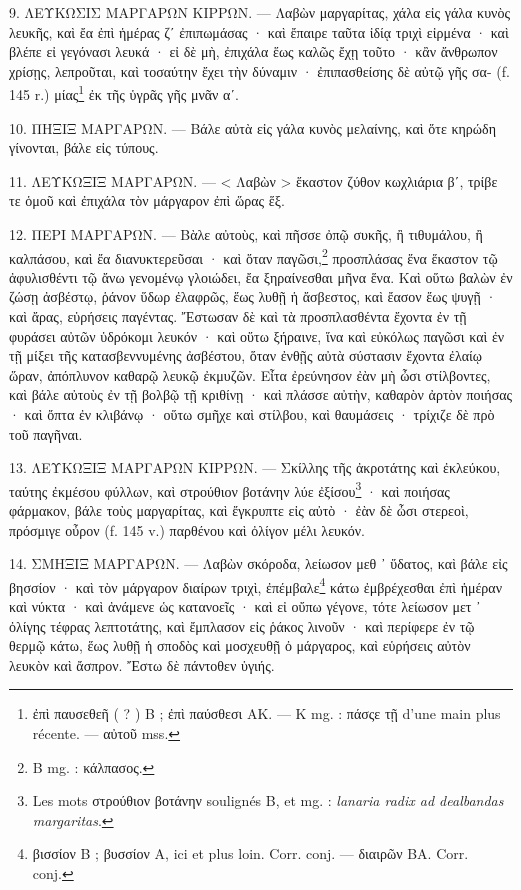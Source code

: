 \documentclass[a4paper, 11pt, oneside, polutonikogreek, french]{article}
\begin{document}
9. ΛΕΥΚΩΣΙΣ ΜΑΡΓΑΡΩΝ ΚΙΡΡΩΝ. --- Λαβὼν μαργαρίτας, χάλα εἰς γάλα κυνὸς λευκῆς, καὶ ἔα ἐπὶ ἡμέρας ζʹ ἐπιπωμάσας · καὶ ἔπαιρε ταῦτα ἰδίᾳ τριχὶ εἰρμένα · καὶ βλέπε εἰ γεγόνασι λευκά · εἰ δὲ μὴ, ἐπιχάλα ἕως καλῶς ἔχῃ τοῦτο · κἂν ἄνθρωπον χρίσῃς, λεπροῦται, καὶ τοσαύτην ἔχει τὴν δύναμιν · ἐπιπασθείσης δὲ αὐτῷ γῆς σα- (f. 145 r.) μίας\footnote{ἐπὶ παυσεθεῆ ( ? ) B ; ἐπὶ παύσθεσι AK. --- K mg. : πάσςε τῇ d'une main plus récente. --- αὐτοῦ mss.} ἐκ τῆς ὑγρᾶς γῆς μνᾶν αʹ.

10. ΠΗΞΙΞ ΜΑΡΓΑΡΩΝ. --- Βάλε αὐτὰ εἰς γάλα κυνὸς μελαίνης, καὶ ὅτε κηρώδη γίνονται, βάλε εἰς τύπους.

11. ΛΕΥΚΩΞΙΞ ΜΑΡΓΑΡΩΝ. --- < Λαβὼν > ἕκαστον ζύθον κωχλιάρια βʹ, τρίβε τε ὁμοῦ καὶ ἐπιχάλα τὸν μάργαρον ἐπὶ ὥρας ἕξ.

12. ΠΕΡΙ ΜΑΡΓΑΡΩΝ. --- Βὰλε αὐτοὺς, καὶ πῆσσε ὀπῷ συκῆς, ἢ τιθυμάλου, ἢ καλπάσου, καὶ ἔα διανυκτερεῦσαι · καὶ ὅταν παγῶσι,\footnote{B mg. : κάλπασος.} προσπλάσας ἕνα ἕκαστον τῷ ἀφυλισθέντι τῷ ἄνω γενομένῳ γλοιώδει, ἔα ξηραίνεσθαι μῆνα ἕνα. Καὶ οὕτω βαλὼν ἐν ζώσῃ ἀσβέστῳ, ῥάνον ὕδωρ ἐλαφρῶς, ἕως λυθῇ ἡ ἄσβεστος, καὶ ἔασον ἕως ψυγῇ · καὶ ἄρας, εὑρήσεις παγέντας. Ἔστωσαν δὲ καὶ τὰ προσπλασθέντα ἔχοντα ἐν τῇ φυράσει αὐτῶν ὑδρόκομι λευκόν · καὶ οὕτω ξήραινε, ἵνα καὶ εὐκόλως παγῶσι καὶ ἐν τῇ μίξει τῆς κατασβεννυμένης ἀσβέστου, ὅταν ἐνθῇς αὐτὰ σύστασιν ἔχοντα ἐλαίῳ ὥραν, ἀπόπλυνον καθαρῷ λευκῷ ἐκμυζῶν. Εἶτα ἐρεύνησον ἐὰν μὴ ὦσι στίλβοντες, καὶ βάλε αὐτοὺς ἐν τῇ βολβῷ τῇ κριθίνῃ · καὶ πλάσσε αὐτὴν, καθαρὸν ἀρτὸν ποιήσας · καὶ ὄπτα ἐν κλιβάνῳ · οὕτω σμῆχε καὶ στίλβου, καὶ θαυμάσεις · τρίχιζε δὲ πρὸ τοῦ παγῆναι.

13. ΛΕΥΚΩΞΙΞ ΜΑΡΓΑΡΩΝ ΚΙΡΡΩΝ. --- Σκίλλης τῆς ἀκροτάτης καὶ ἐκλεύκου, ταύτης ἐκμέσου φύλλων, καὶ στρούθιον βοτάνην λύε ἐξίσου\footnote{Les mots στρούθιον βοτάνην soulignés B, et mg. : \emph{lanaria radix ad dealbandas margaritas}.} · καὶ ποιήσας φάρμακον, βάλε τοὺς μαργαρίτας, καὶ ἔγκρυπτε εἰς αὐτὸ · ἐὰν δὲ ὦσι στερεοὶ, πρόσμιγε οὖρον (f. 145 v.) παρθένου καὶ ὀλίγον μέλι λευκόν.

14. ΣΜΗΞΙΞ ΜΑΡΓΑΡΩΝ. --- Λαβὼν σκόροδα, λείωσον μεθ ᾽ ὕδατος, καὶ βάλε εἰς βησσίον · καὶ τὸν μάργαρον διαίρων τριχὶ, ἐπέμβαλε\footnote{βισσίον B ; βυσσίον A, ici et plus loin. Corr. conj. --- διαιρῶν BA. Corr. conj.} κάτω ἐμβρέχεσθαι ἐπὶ ἡμέραν καὶ νύκτα · καὶ ἀνάμενε ὡς κατανοεῖς · καὶ εἰ οὔπω γέγονε, τότε λείωσον μετ ᾽ ὀλίγης τέφρας λεπτοτάτης, καὶ ἔμπλασον εἰς ῥάκος λινοῦν · καὶ περίφερε ἐν τῷ θερμῷ κάτω, ἕως λυθῇ ἡ σποδὸς καὶ μοσχευθῇ ὀ μάργαρος, καὶ εὑρήσεις αὐτὸν λευκὸν καὶ ἄσπρον. Ἔστω δὲ πάντοθεν ὑγιής.
\end{document}
